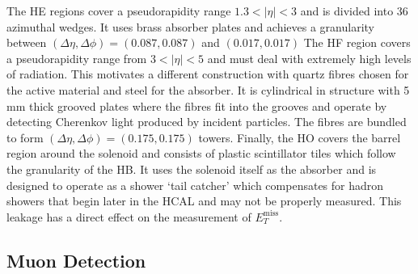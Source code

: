 The HE regions cover a pseudorapidity range $1.3<|\eta|<3$ and is divided into 36 azimuthal wedges. It uses brass absorber plates and achieves a granularity between $(\Delta\eta,\Delta\phi) = (0.087,0.087)$ and $(0.017,0.017)$
The HF region covers a pseudorapidity range from $3<|\eta|<5$ and must deal with extremely high levels of radiation. This motivates a different construction with quartz fibres chosen for the active material and steel for the absorber. It is cylindrical in structure with 5\,mm thick grooved plates where the fibres fit into the grooves and operate by detecting Cherenkov light produced by incident particles. The fibres are bundled to form $(\Delta\eta,\Delta\phi) = (0.175,0.175)$ towers.
Finally, the HO covers the barrel region around the solenoid and consists of plastic scintillator tiles which follow the granularity of the HB. It uses the solenoid itself as the absorber and is designed to operate as a shower `tail catcher' which compensates for hadron showers that begin later in the HCAL and may not be properly measured. This leakage has a direct effect on the measurement of $E_{T}^{\mathrm{miss}}$.



\subsection{Muon Detection}

